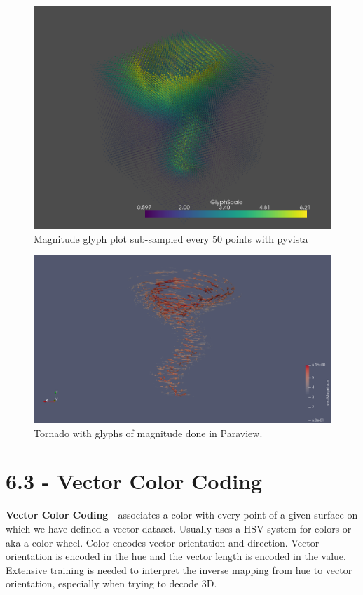 \documentclass{article}
\begin{document}
\begin{figure}[H]
\caption{Magnitude glyph plot sub-sampled every 50 points with pyvista }
\centering
\includegraphics[scale=.4]{tornado_glyph_sample_50.png}
\end{figure}

\begin{figure}[H]
\caption{Tornado with glyphs of magnitude done in Paraview.}
\centering
\includegraphics[scale=.35]{tornado_glyphs_pv.png}
\end{figure}

\section*{6.3 - Vector Color Coding}
\textbf{Vector Color Coding} - associates a color with every point of a given surface on which we have defined a vector dataset. Usually uses a HSV system for colors or aka a color wheel. Color encodes vector orientation and direction. Vector orientation is encoded in the hue and the vector length is encoded in the value. Extensive training is needed to interpret the inverse mapping from hue to vector orientation, especially when trying to decode 3D.
\end{document}
